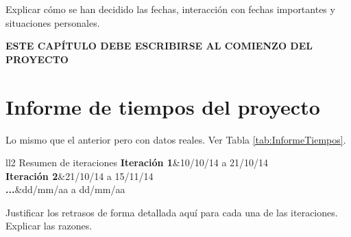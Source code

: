 Explicar cómo se han decidido las fechas, interacción con fechas importantes y situaciones personales.

\textbf{ESTE CAPÍTULO DEBE ESCRIBIRSE AL COMIENZO DEL PROYECTO}

\section{Informe de tiempos del proyecto}

Lo mismo que el anterior pero con datos reales. Ver Tabla \ref{tab:InformeTiempos}.

\begin{table*}[htb]
	\centering
	\begin{coolTable}{ll}{2}
{Resumen de iteraciones}
	\textbf{Iteración 1}&10/10/14 a 21/10/14\\
	\textbf{Iteración 2}&21/10/14 a 15/11/14\\
	\textbf{...}&dd/mm/aa a dd/mm/aa\\
	\end{coolTable}
	\caption{Planificación temporal de iteraciones\label{tab:InformeTiempos}}
\end{table*}

Justificar los retrasos de forma detallada aquí para cada una de las iteraciones. Explicar las razones.
